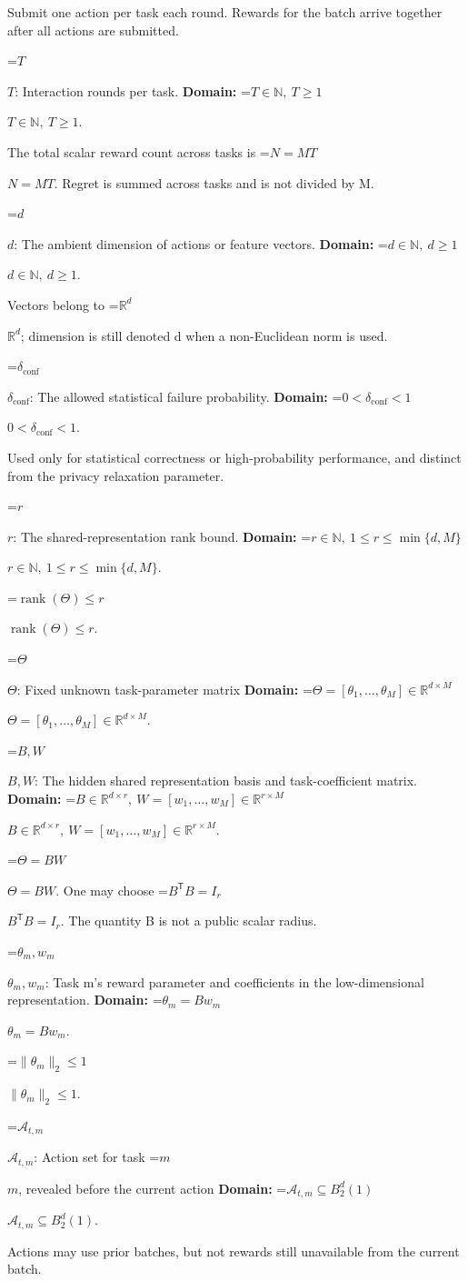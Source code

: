 \documentclass[10pt,a4paper]{article}
\newcommand{\AtlasMath}[1]{\par\begingroup\centering\setbox0=\hbox{$\displaystyle #1$}\ifdim\wd0>1.4\linewidth\typeout{ATLAS WIDE FORMULA: \the\wd0}\fi\ifdim\wd0>\linewidth\resizebox{\linewidth}{!}{\box0}\else\box0\fi\par\endgroup}
\newcommand{\AtlasInlineMath}[1]{\begingroup\setbox0=\hbox{$#1$}\ifdim\wd0>.4\linewidth\endgroup\AtlasMath{#1}\else\endgroup$#1$\fi}
\begin{document}
Submit one action per task each round. Rewards for the batch arrive together after all actions are submitted.

\AtlasInlineMath{T}: Interaction rounds per task. \textbf{Domain:} \AtlasInlineMath{T\in\mathbb N,\ T\ge1}.

The total scalar reward count across tasks is \AtlasInlineMath{N=MT}. Regret is summed across tasks and is not divided by M.

\AtlasInlineMath{d}: The ambient dimension of actions or feature vectors. \textbf{Domain:} \AtlasInlineMath{d\in\mathbb N,\ d\ge1}.

Vectors belong to \AtlasInlineMath{\mathbb R^d}; dimension is still denoted d when a non-Euclidean norm is used.

\AtlasInlineMath{\delta_{\mathrm{conf}}}: The allowed statistical failure probability. \textbf{Domain:} \AtlasInlineMath{0<\delta_{\mathrm{conf}}<1}.

Used only for statistical correctness or high-probability performance, and distinct from the privacy relaxation parameter.

\AtlasInlineMath{r}: The shared-representation rank bound. \textbf{Domain:} \AtlasInlineMath{r\in\mathbb N,\ 1\le r\le\min\{d,M\}}.

\AtlasInlineMath{\operatorname{rank}(\Theta)\le r}.

\AtlasInlineMath{\Theta}: Fixed unknown task-parameter matrix \textbf{Domain:} \AtlasInlineMath{\Theta=[\theta_1,\ldots,\theta_M]\in\mathbb R^{d\times M}}.

\AtlasInlineMath{B,W}: The hidden shared representation basis and task-coefficient matrix. \textbf{Domain:} \AtlasInlineMath{B\in\mathbb R^{d\times r},\ W=[w_1,\ldots,w_M]\in\mathbb R^{r\times M}}.

\AtlasInlineMath{\Theta=BW}. One may choose \AtlasInlineMath{B^{\mathsf T}B=I_r}. The quantity B is not a public scalar radius.

\AtlasInlineMath{\theta_m,w_m}: Task m’s reward parameter and coefficients in the low-dimensional representation. \textbf{Domain:} \AtlasInlineMath{\theta_m=Bw_m}.

\AtlasInlineMath{\|\theta_m\|_2\le1}.

\AtlasInlineMath{\mathcal A_{t,m}}: Action set for task \AtlasInlineMath{m}, revealed before the current action \textbf{Domain:} \AtlasInlineMath{\mathcal A_{t,m}\subseteq B_2^d(1)}.

Actions may use prior batches, but not rewards still unavailable from the current batch.
\end{document}

